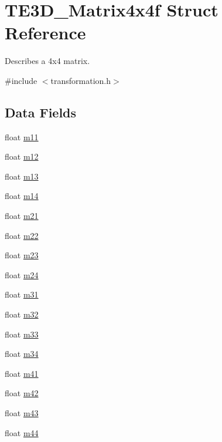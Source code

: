 \hypertarget{struct_t_e3_d___matrix4x4f}{\section{T\-E3\-D\-\_\-\-Matrix4x4f Struct Reference}
\label{struct_t_e3_d___matrix4x4f}
}


Describes a 4x4 matrix.  




{\ttfamily \#include $<$transformation.\-h$>$}

\subsection*{Data Fields}
\begin{DoxyCompactItemize}
\item 
float \hyperlink{struct_t_e3_d___matrix4x4f_a02c16113c6c4ce99349a1dc82bdc21cc}{m11}
\item 
float \hyperlink{struct_t_e3_d___matrix4x4f_aec316cfb9b53d085372bf0cd0c769af1}{m12}
\item 
float \hyperlink{struct_t_e3_d___matrix4x4f_ac7bf992102416f7ab7da5a4ef7341cb6}{m13}
\item 
float \hyperlink{struct_t_e3_d___matrix4x4f_a2e0c3382c5e0ca04b5e12ca957888c0f}{m14}
\item 
float \hyperlink{struct_t_e3_d___matrix4x4f_a7f8222cebbd5007d7b56d367d0a6ab2a}{m21}
\item 
float \hyperlink{struct_t_e3_d___matrix4x4f_a3f6c71e06ae8d5e18af7c50f20b0acd6}{m22}
\item 
float \hyperlink{struct_t_e3_d___matrix4x4f_a777da9b73eb3d9a5ef1b5c2d54daf90e}{m23}
\item 
float \hyperlink{struct_t_e3_d___matrix4x4f_af71e26baf28c2b05054b737ee9ec2566}{m24}
\item 
float \hyperlink{struct_t_e3_d___matrix4x4f_af66b0b91043ff95a9ef5af104b82a25b}{m31}
\item 
float \hyperlink{struct_t_e3_d___matrix4x4f_a94bf9c417b8241a4fea0783bd56c5466}{m32}
\item 
float \hyperlink{struct_t_e3_d___matrix4x4f_a869382309bd500b986d2449b9f3ff04d}{m33}
\item 
float \hyperlink{struct_t_e3_d___matrix4x4f_a47f48dd782d9aecaeb991c731644a403}{m34}
\item 
float \hyperlink{struct_t_e3_d___matrix4x4f_a3882cc332843de4149f6c5ff5af1bb86}{m41}
\item 
float \hyperlink{struct_t_e3_d___matrix4x4f_a9bd4e6d41a5feff4bab28073660271c5}{m42}
\item 
float \hyperlink{struct_t_e3_d___matrix4x4f_a1b674f7005a1d63c42667b35f54ec444}{m43}
\item 
float \hyperlink{struct_t_e3_d___matrix4x4f_a0eee6f390968c7309d0a4ae6f1bb3e57}{m44}
\end{DoxyCompactItemize}


